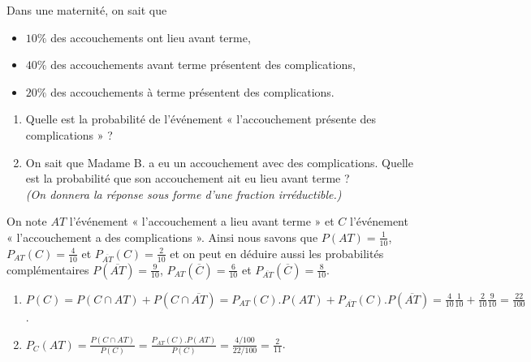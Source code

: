 \documentclass[a4paper,12pt,reqno]{amsart}
\begin{document}
\begin{exo}

  Dans une maternité, on sait que
  \begin{itemize}
    \item $10 \%$ des accouchements ont lieu avant terme,
    \item $40 \%$ des accouchements avant terme présentent des complications,
    \item $20 \%$ des accouchements à terme présentent des complications.
  \end{itemize}
  \begin{enumerate}
    \item Quelle est la probabilité de l'événement « l'accouchement présente des complications » ?
    \item On sait que Madame B. a eu un accouchement avec des complications. Quelle est la probabilité que son accouchement ait eu lieu avant terme ?\\
    \emph{(On donnera la réponse sous forme d'une fraction irréductible.)}
\end{enumerate}

\end{exo}

\begin{solution}
  On note $AT$ l'événement « l'accouchement a lieu avant terme » et $C$ l'événement « l'accouchement a des complications ». Ainsi nous savons que $P(AT)=\frac{1}{10}$, $P_{AT}(C)=\frac{4}{10}$ et $P_{\overline{AT}}(C)=\frac{2}{10}$ et on peut en déduire aussi les probabilités complémentaires $P(\overline{AT})=\frac{9}{10}$, $P_{AT}(\overline{C})=\frac{6}{10}$ et $P_{\overline{AT}}(\overline{C})=\frac{8}{10}$.
  \begin{enumerate}
    \item $P(C) = P(C\cap AT) + P(C\cap \overline{AT})= P_{AT}(C).P(AT) + P_{\overline{AT}}(C).P(\overline{AT}) = \frac{4}{10}\frac{1}{10} + \frac{2}{10}\frac{9}{10} = \frac{22}{100}$.
    \item $P_{C}(AT) = \frac{P(C \cap AT)}{P(C)} = \frac{P_{AT}(C).P(AT)}{P(C)} = \frac{4/100}{22/100} = \frac{2}{11}$.
  \end{enumerate}

\end{solution}
\end{document}
